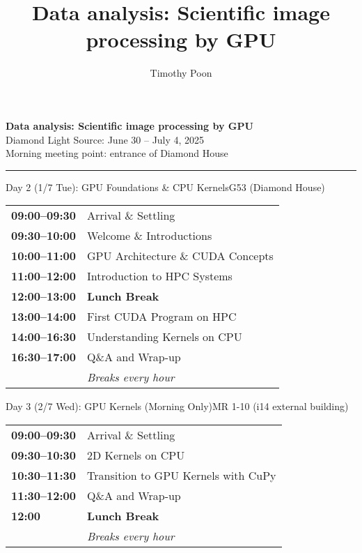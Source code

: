\documentclass[11pt, a4paper]{article}
\title{Data analysis: Scientific image processing by GPU}
\author{Timothy Poon}
\date{}
\begin{document}
\begin{center}
    {\LARGE\bfseries Data analysis: Scientific image processing by GPU}\\[0.5em]
    {\large\color{textsecondary} Diamond Light Source: June 30 -- July 4, 2025}\\[0.3em]
    {\color{textmuted} Morning meeting point: entrance of Diamond House}
\end{center}

\vspace{1em}
{\color{accentpurple}\hrule height 2pt}
\vspace{1.5em}

\begin{daycard}{Day 2 (1/7 Tue): GPU Foundations \& CPU Kernels}{G53 (Diamond House)}
\begin{tabular}{@{}p{2.8cm}p{\dimexpr\linewidth-3.1cm}@{}}
\textbf{\color{textmuted}09:00--09:30} & Arrival \& Settling \\
\textbf{\color{textmuted}09:30--10:00} & Welcome \& Introductions \\
\textbf{\color{textmuted}10:00--11:00} & GPU Architecture \& CUDA Concepts \\
\textbf{\color{textmuted}11:00--12:00} & Introduction to HPC Systems \\
\textbf{\color{textmuted}12:00--13:00} & \textbf{Lunch Break} \\
\textbf{\color{textmuted}13:00--14:00} & First CUDA Program on HPC \\
\textbf{\color{textmuted}14:00--16:30} & Understanding Kernels on CPU \\
\textbf{\color{textmuted}16:30--17:00} & Q\&A and Wrap-up \\[0.3em]
& \textit{\color{textsecondary}Breaks every hour}
\end{tabular}
\end{daycard}

\vspace{1em}

\begin{daycard}{Day 3 (2/7 Wed): GPU Kernels (Morning Only)}{MR 1-10 (i14 external building)}
\begin{tabular}{@{}p{2.8cm}p{\dimexpr\linewidth-3.1cm}@{}}
\textbf{\color{textmuted}09:00--09:30} & Arrival \& Settling \\
\textbf{\color{textmuted}09:30--10:30} & 2D Kernels on CPU \\
\textbf{\color{textmuted}10:30--11:30} & Transition to GPU Kernels with CuPy \\
\textbf{\color{textmuted}11:30--12:00} & Q\&A and Wrap-up \\
\textbf{\color{textmuted}12:00} & \textbf{Lunch Break} \\[0.3em]
& \textit{\color{textsecondary}Breaks every hour}
\end{tabular}
\end{daycard}
\end{document}
